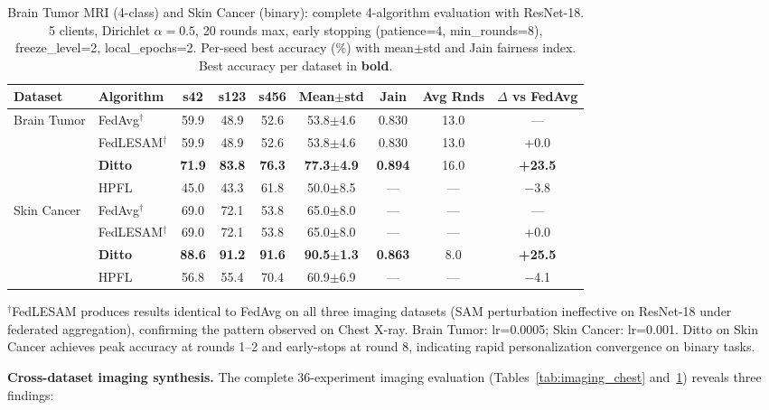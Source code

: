 \documentclass[conference,a4paper]{IEEEtran}
\begin{document}
\begin{table}[htbp]
\centering
\caption{Brain Tumor MRI (4-class) and Skin Cancer (binary): complete 4-algorithm evaluation with ResNet-18. 5 clients, Dirichlet $\alpha{=}0.5$, 20 rounds max, early stopping (patience=4, min\_rounds=8), freeze\_level=2, local\_epochs=2. Per-seed best accuracy (\%) with mean$\pm$std and Jain fairness index. Best accuracy per dataset in \textbf{bold}.}
\label{tab:imaging_bt_sc_full}
\small
\begin{tabular}{llccccccc}
\toprule
\textbf{Dataset} & \textbf{Algorithm} & \textbf{s42} & \textbf{s123} & \textbf{s456} & \textbf{Mean$\pm$std} & \textbf{Jain} & \textbf{Avg Rnds} & \textbf{$\Delta$ vs FedAvg} \\
\midrule
\multirow{4}{*}{Brain Tumor} & FedAvg$^\dagger$ & 59.9 & 48.9 & 52.6 & 53.8$\pm$4.6 & 0.830 & 13.0 & --- \\
 & FedLESAM$^\dagger$ & 59.9 & 48.9 & 52.6 & 53.8$\pm$4.6 & 0.830 & 13.0 & +0.0 \\
 & \textbf{Ditto} & \textbf{71.9} & \textbf{83.8} & \textbf{76.3} & \textbf{77.3$\pm$4.9} & \textbf{0.894} & 16.0 & \textbf{+23.5} \\
 & HPFL & 45.0 & 43.3 & 61.8 & 50.0$\pm$8.5 & --- & --- & $-$3.8 \\
\midrule
\multirow{4}{*}{Skin Cancer} & FedAvg$^\dagger$ & 69.0 & 72.1 & 53.8 & 65.0$\pm$8.0 & --- & --- & --- \\
 & FedLESAM$^\dagger$ & 69.0 & 72.1 & 53.8 & 65.0$\pm$8.0 & --- & --- & +0.0 \\
 & \textbf{Ditto} & \textbf{88.6} & \textbf{91.2} & \textbf{91.6} & \textbf{90.5$\pm$1.3} & \textbf{0.863} & 8.0 & \textbf{+25.5} \\
 & HPFL & 56.8 & 55.4 & 70.4 & 60.9$\pm$6.9 & --- & --- & $-$4.1 \\
\bottomrule
\end{tabular}
\par{\footnotesize $^\dagger$FedLESAM produces results identical to FedAvg on all three imaging datasets (SAM perturbation ineffective on ResNet-18 under federated aggregation), confirming the pattern observed on Chest X-ray. Brain Tumor: lr=0.0005; Skin Cancer: lr=0.001. Ditto on Skin Cancer achieves peak accuracy at rounds 1--2 and early-stops at round 8, indicating rapid personalization convergence on binary tasks.}
\end{table}

\textbf{Cross-dataset imaging synthesis.} The complete 36-experiment imaging evaluation (Tables~\ref{tab:imaging_chest} and~\ref{tab:imaging_bt_sc_full}) reveals three findings:
\end{document}
